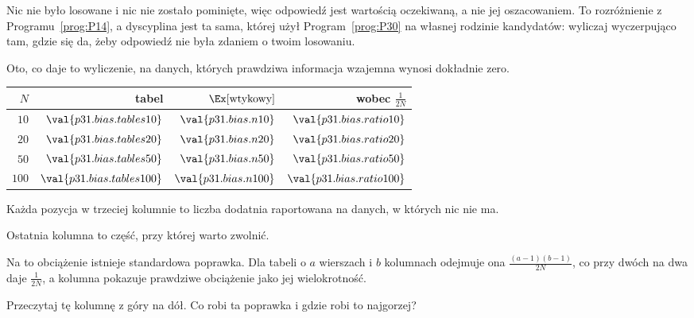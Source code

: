 \begin{fr}

Nic nie było losowane i nic nie zostało pominięte, więc odpowiedź jest
wartością oczekiwaną, a nie jej oszacowaniem. To rozróżnienie z
Programu~\ref{prog:P14}, a dyscyplina jest ta sama, której użył
Program~\ref{prog:P30} na własnej rodzinie kandydatów: wyliczaj wyczerpująco
tam, gdzie się da, żeby odpowiedź nie była zdaniem o twoim losowaniu.

Oto, co daje to wyliczenie, na danych, których prawdziwa informacja wzajemna
wynosi dokładnie zero.

\begin{center}
\begin{tabular}{rrrr}
\toprule
$N$ & tabel & $\Ex[\text{wtykowy}]$ & wobec $\frac{1}{2N}$ \\
\midrule
$10$ & $\val{p31.bias.tables10}$ & $\val{p31.bias.n10}$ & $\val{p31.bias.ratio10}$ \\
$20$ & $\val{p31.bias.tables20}$ & $\val{p31.bias.n20}$ & $\val{p31.bias.ratio20}$ \\
$50$ & $\val{p31.bias.tables50}$ & $\val{p31.bias.n50}$ & $\val{p31.bias.ratio50}$ \\
$100$ & $\val{p31.bias.tables100}$ & $\val{p31.bias.n100}$ & $\val{p31.bias.ratio100}$ \\
\bottomrule
\end{tabular}
\end{center}

Każda pozycja w trzeciej kolumnie to liczba dodatnia raportowana na danych,
w których nic nie ma.
\end{fr}

\begin{fr}
Ostatnia kolumna to część, przy której warto zwolnić.

Na to obciążenie istnieje standardowa poprawka. Dla tabeli o $a$ wierszach i
$b$ kolumnach odejmuje ona $\frac{(a-1)(b-1)}{2N}$, co przy dwóch na dwa
daje $\frac{1}{2N}$, a kolumna pokazuje prawdziwe obciążenie jako jej
wielokrotność.

Przeczytaj tę kolumnę z góry na dół. Co robi ta poprawka i gdzie robi to
najgorzej?
\dotline
\nextframe
\end{fr}

